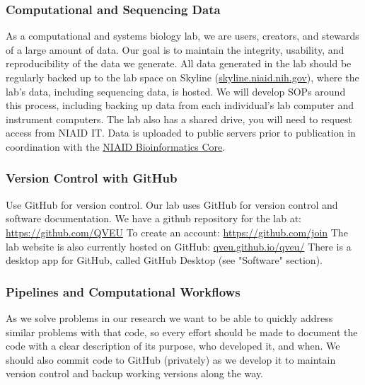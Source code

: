 \documentclass[10pt, letterpaper, twocolumn]{article} %
\begin{document}
\subsubsection{Computational and Sequencing Data}
As a computational and systems biology lab, we are users, creators, and stewards of a large amount of data. Our goal is to maintain the integrity, usability, and reproducibility of the data we generate. All data generated in the lab should be regularly backed up to the lab space on Skyline (\href{https://skyline.niaid.nih.gov}{skyline.niaid.nih.gov}), where the lab's data, including sequencing data, is hosted. We will develop SOPs around this process, including backing up data from each individual's lab computer and instrument computers. The lab also has a shared drive, you will need to request access from NIAID IT. Data is uploaded to public servers prior to publication in coordination with the \href{https://bioinformatics.niaid.nih.gov/}{NIAID Bioinformatics Core}.

\subsubsection{Version Control with GitHub}
Use GitHub for version control. Our lab uses GitHub for version control and software documentation. We have a github repository for the lab at: \href{https://github.com/QVEU}{https://github.com/QVEU}
To create an account: \href{https://github.com/join}{https://github.com/join}
The lab website is also currently hosted on GitHub: \href{https://qveu.github.io/QVEU/}{qveu.github.io/qveu/}
\newline
There is a desktop app for GitHub, called GitHub Desktop (see "Software" section).

\subsubsection{Pipelines and Computational Workflows}
As we solve problems in our research we want to be able to quickly address similar problems with that code, so every effort should be made to document the code with a clear description of its purpose, who developed it, and when. We should also commit code to GitHub (privately) as we develop it to maintain version control and backup working versions along the way. 
\end{document}
